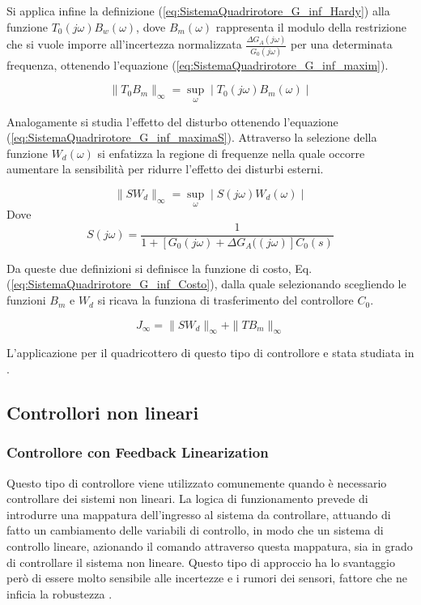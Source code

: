 Si applica infine la definizione (\ref{eq:SistemaQuadrirotore_G_inf_Hardy}) alla funzione $T_0(j \omega) B_w(\omega)$, dove $B_m(\omega)$ rappresenta il modulo della restrizione che si vuole imporre all'incertezza normalizzata $\frac{\Delta G_A(j \omega)}{G_0 (j \omega)}$ per una determinata frequenza, ottenendo l'equazione (\ref{eq:SistemaQuadrirotore_G_inf_maxim}).

\begin{equation}\label{eq:SistemaQuadrirotore_G_inf_maxim}
		\|T_0 B_m\|_\infty = \sup_\omega \mid T_0(j \omega) B_m(\omega) \mid
\end{equation}

Analogamente si studia l'effetto del disturbo ottenendo l'equazione (\ref{eq:SistemaQuadrirotore_G_inf_maximaS}). Attraverso la selezione della funzione $W_d(\omega)$ si enfatizza la regione di frequenze nella quale occorre aumentare la sensibilità per ridurre l'effetto dei disturbi esterni.

\begin{equation}\label{eq:SistemaQuadrirotore_G_inf_maximaS}
	\|S W_d\|_\infty = \sup_\omega \mid S(j \omega) W_d(\omega) \mid
\end{equation}
Dove 
\[ 
	S(j \omega) = \frac{1}{1+ \left[G_0(j \omega) + \Delta G_A((j \omega) \right]C_0(s)}
\]

Da queste due definizioni si definisce la funzione di costo, Eq. (\ref{eq:SistemaQuadrirotore_G_inf_Costo}), dalla quale selezionando scegliendo le funzioni $B_m$ e $W_d$ si ricava la funziona di trasferimento del controllore $C_0$.

\begin{equation}\label{eq:SistemaQuadrirotore_G_inf_Costo}
	J_\infty = \| S W_d \|_\infty + \| T B_m\|_\infty
\end{equation}

L'applicazione per il quadricottero di questo tipo di controllore e stata studiata in \cite{G_inf}.

\subsection{Controllori non lineari}

\subsubsection{Controllore con Feedback Linearization}

Questo tipo di controllore viene utilizzato comunemente quando è necessario controllare dei sistemi non lineari. La logica di funzionamento prevede di introdurre una mappatura dell'ingresso al sistema da controllare, attuando di fatto un cambiamento delle variabili di controllo, in modo che un sistema di controllo lineare, azionando il comando attraverso questa mappatura, sia in grado di controllare il sistema non lineare.  Questo tipo di approccio ha lo svantaggio però di essere molto sensibile alle incertezze e i rumori dei sensori, fattore che ne inficia la robustezza \cite{KimJinho2020ACSo}.

